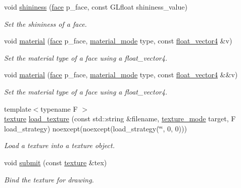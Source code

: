 \begin{DoxyCompactItemize}
void \hyperlink{namespaceglpp_a9e3bb9dfb1ee92a249e1e6753b236ffe}{shininess} (\hyperlink{namespaceglpp_aebf73491431939f1e6ec6ec2d4404244}{face} p\+\_\+face, const G\+Lfloat shininess\+\_\+value)
\begin{DoxyCompactList}\small\item\em Set the shininess of a face. \end{DoxyCompactList}\item 
void \hyperlink{namespaceglpp_ae4bb1bccd0fef43a3f2540bec5fd60d7}{material} (\hyperlink{namespaceglpp_aebf73491431939f1e6ec6ec2d4404244}{face} p\+\_\+face, \hyperlink{namespaceglpp_a22c1a014f4ca14e1aa6b91f855910573}{material\+\_\+mode} type, const \hyperlink{namespaceglpp_ab4a3d7b8ed8e2e4810006eef5213a460}{float\+\_\+vector4} \&v)
\begin{DoxyCompactList}\small\item\em Set the material type of a face using a float\+\_\+vector4. \end{DoxyCompactList}\item 
void \hyperlink{namespaceglpp_acb3262496cd6eb15f33cb2a9723d04f8}{material} (\hyperlink{namespaceglpp_aebf73491431939f1e6ec6ec2d4404244}{face} p\+\_\+face, \hyperlink{namespaceglpp_a22c1a014f4ca14e1aa6b91f855910573}{material\+\_\+mode} type, const \hyperlink{namespaceglpp_ab4a3d7b8ed8e2e4810006eef5213a460}{float\+\_\+vector4} \&\&v)
\begin{DoxyCompactList}\small\item\em Set the material type of a face using a float\+\_\+vector4. \end{DoxyCompactList}\item 
{\footnotesize template$<$typename F $>$ }\\\hyperlink{classglpp_1_1texture}{texture} \hyperlink{namespaceglpp_a0ed53f477ba84e11e621381832f7bf41}{load\+\_\+texture} (const std\+::string \&filename, \hyperlink{namespaceglpp_a09dd2630cf15f1c3f3b4164c59cc7d26}{texture\+\_\+mode} target, F load\+\_\+strategy) noexcept(noexcept(load\+\_\+strategy(\char`\"{}\char`\"{}, 0, 0)))
\begin{DoxyCompactList}\small\item\em Load a texture into a texture object. \end{DoxyCompactList}\item 
void \hyperlink{namespaceglpp_a0f22518667f7fad612bc6cf731c83580}{submit} (const \hyperlink{classglpp_1_1texture}{texture} \&tex)
\begin{DoxyCompactList}\small\item\em Bind the texture for drawing. \end{DoxyCompactList}\end{DoxyCompactItemize}


